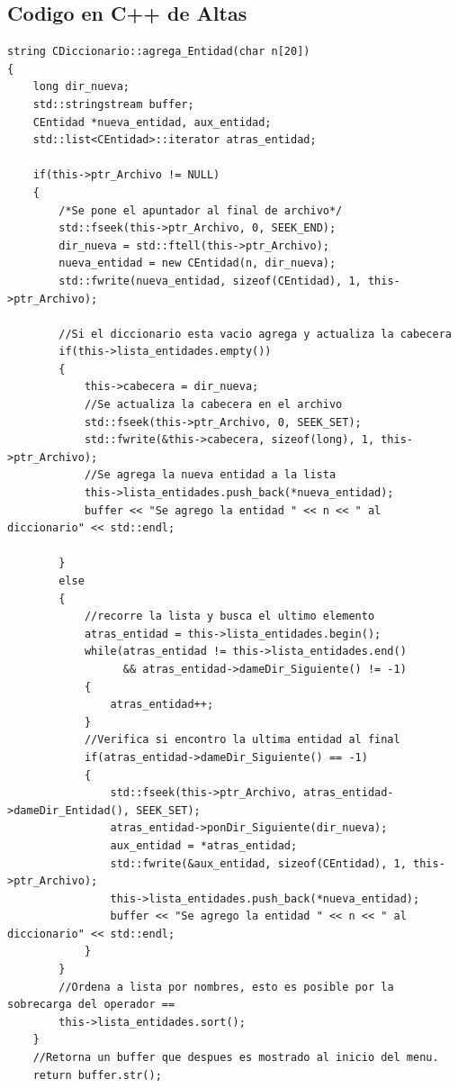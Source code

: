 \newpage
\subsection{Codigo en C++ de Altas}
\begin{lstlisting}[frame=single]
string CDiccionario::agrega_Entidad(char n[20])
{
    long dir_nueva;
    std::stringstream buffer;
    CEntidad *nueva_entidad, aux_entidad;
    std::list<CEntidad>::iterator atras_entidad;

    if(this->ptr_Archivo != NULL)
    {
        /*Se pone el apuntador al final de archivo*/
        std::fseek(this->ptr_Archivo, 0, SEEK_END);
        dir_nueva = std::ftell(this->ptr_Archivo);
        nueva_entidad = new CEntidad(n, dir_nueva);
        std::fwrite(nueva_entidad, sizeof(CEntidad), 1, this->ptr_Archivo);

        //Si el diccionario esta vacio agrega y actualiza la cabecera
        if(this->lista_entidades.empty())
        {
            this->cabecera = dir_nueva;
            //Se actualiza la cabecera en el archivo
            std::fseek(this->ptr_Archivo, 0, SEEK_SET);
            std::fwrite(&this->cabecera, sizeof(long), 1, this->ptr_Archivo);
            //Se agrega la nueva entidad a la lista
            this->lista_entidades.push_back(*nueva_entidad);
            buffer << "Se agrego la entidad " << n << " al diccionario" << std::endl;

        }
        else
        {
            //recorre la lista y busca el ultimo elemento
            atras_entidad = this->lista_entidades.begin();
            while(atras_entidad != this->lista_entidades.end()
                  && atras_entidad->dameDir_Siguiente() != -1)
            {
                atras_entidad++;
            }
            //Verifica si encontro la ultima entidad al final
            if(atras_entidad->dameDir_Siguiente() == -1)
            {
                std::fseek(this->ptr_Archivo, atras_entidad->dameDir_Entidad(), SEEK_SET);
                atras_entidad->ponDir_Siguiente(dir_nueva);
                aux_entidad = *atras_entidad;
                std::fwrite(&aux_entidad, sizeof(CEntidad), 1, this->ptr_Archivo);
                this->lista_entidades.push_back(*nueva_entidad);
                buffer << "Se agrego la entidad " << n << " al diccionario" << std::endl;
            }
        }
        //Ordena a lista por nombres, esto es posible por la sobrecarga del operador ==
        this->lista_entidades.sort();
    }
    //Retorna un buffer que despues es mostrado al inicio del menu.
    return buffer.str();
\end{lstlisting}

